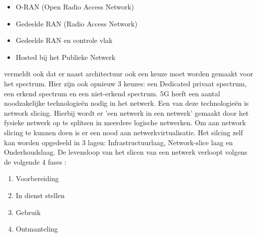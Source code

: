 \begin{itemize}
  \item O-RAN (Open Radio Access Network)
  \item Gedeelde RAN (Radio Access Network)
  \item Gedeelde RAN en controle vlak
  \item Hosted bij het Publieke Netwerk
\end{itemize}

\textcite{wen2021private} vermeldt ook dat er naast architectuur ook een keuze moet worden gemaakt voor het spectrum. Hier zijn ook opnieuw 3 keuzes: een Dedicated privaat spectrum, een erkend spectrum en een niet-erkend spectrum. 
5G heeft een aantal noodzakelijke technologieën nodig in het netwerk. Een van deze technologieën is network slicing. Hierbij wordt er 'een netwerk in een netwerk' gemaakt door het fysieke netwerk op te splitsen in meerdere logische netwerken. Om aan network slicing te kunnen doen is er een nood aan netwerkvirtualisatie. Het silcing zelf kan worden opgedeeld in 3 lagen: Infrastructuurlaag, Network-slice laag en Onderhoudslaag. De levensloop van het slicen van een netwerk verloopt volgens de volgende 4 fases \autocite{wen2021private}:

\begin{enumerate}
  \item Voorbereiding
  \item In dienst stellen
  \item Gebruik
  \item Ontmanteling
\end{enumerate}

